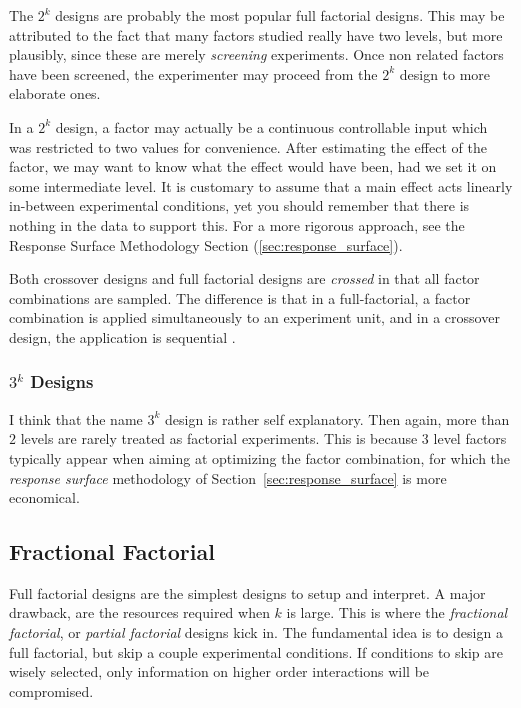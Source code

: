 \begin{remark}
The $2^k$ designs are probably the most popular full factorial designs. 
This may be attributed to the fact that many factors studied really have two levels, but more plausibly, since these are merely \emph{screening} experiments. 
Once non related factors have been screened, the experimenter may proceed from the $2^k$ design to more elaborate ones. 
\end{remark}



\begin{remark}
In a $2^k$ design, a factor may actually be a continuous controllable input which was restricted to two values for convenience. 
After estimating the effect of the factor, we may want to know what the effect would have been, had we set it on some intermediate level.
It is customary to assume that a main effect acts linearly in-between experimental conditions, yet you should remember that there is nothing in the data to support this.
For a more rigorous approach, see the Response Surface Methodology Section (\ref{sec:response_surface}).
\end{remark}


\begin{remark}
Both crossover designs and full factorial designs are \emph{crossed} in that all factor combinations are sampled. 
The difference is that in a full-factorial, a factor combination is applied simultaneously to an experiment unit, and in a crossover design, the application is sequential \citep{everitt_cambridge_2010}.
\end{remark}



\subsubsection{$3^k$ Designs}
I think that the name $3^k$ design is rather self explanatory.
Then again, more than $2$ levels are rarely treated as factorial experiments. 
This is because $3$ level factors typically appear when aiming at optimizing the factor combination, for which the \emph{response surface} methodology of Section~\ref{sec:response_surface} is more economical.




\subsection{Fractional Factorial}
Full factorial designs are the simplest designs to setup and interpret. 
A major drawback, are the resources required when $k$ is large. 
This is where the \emph{fractional factorial}, or \emph{partial factorial} designs kick in.
The fundamental idea is to design a full factorial, but skip a couple experimental conditions. If conditions to skip are wisely selected, only information on higher order interactions will be compromised.


